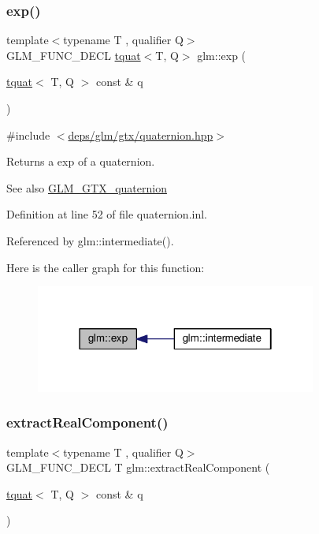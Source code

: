 \subsubsection{\texorpdfstring{exp()}{exp()}}
{\footnotesize\ttfamily template$<$typename T , qualifier Q$>$ \\
G\+L\+M\+\_\+\+F\+U\+N\+C\+\_\+\+D\+E\+CL \hyperlink{structglm_1_1tquat}{tquat}$<$T, Q$>$ glm\+::exp (\begin{DoxyParamCaption}\item[{\hyperlink{structglm_1_1tquat}{tquat}$<$ T, Q $>$ const \&}]{q }\end{DoxyParamCaption})}



{\ttfamily \#include $<$\hyperlink{gtx_2quaternion_8hpp}{deps/glm/gtx/quaternion.\+hpp}$>$}

Returns a exp of a quaternion.

\begin{DoxySeeAlso}{See also}
\hyperlink{group__gtx__quaternion}{G\+L\+M\+\_\+\+G\+T\+X\+\_\+quaternion} 
\end{DoxySeeAlso}


Definition at line 52 of file quaternion.\+inl.



Referenced by glm\+::intermediate().

Here is the caller graph for this function\+:
\nopagebreak
\begin{figure}[H]
\begin{center}
\leavevmode
\includegraphics[width=262pt]{d8/db2/group__gtx__quaternion_ga72275e87ce62dc75a06d39a6c049835c_icgraph}
\end{center}
\end{figure}
\mbox{\label{group__gtx__quaternion_ga312385d0a8caa24c1daaa1d00ce4c2d3}} 
\subsubsection{\texorpdfstring{extract\+Real\+Component()}{extractRealComponent()}}
{\footnotesize\ttfamily template$<$typename T , qualifier Q$>$ \\
G\+L\+M\+\_\+\+F\+U\+N\+C\+\_\+\+D\+E\+CL T glm\+::extract\+Real\+Component (\begin{DoxyParamCaption}\item[{\hyperlink{structglm_1_1tquat}{tquat}$<$ T, Q $>$ const \&}]{q }\end{DoxyParamCaption})}



